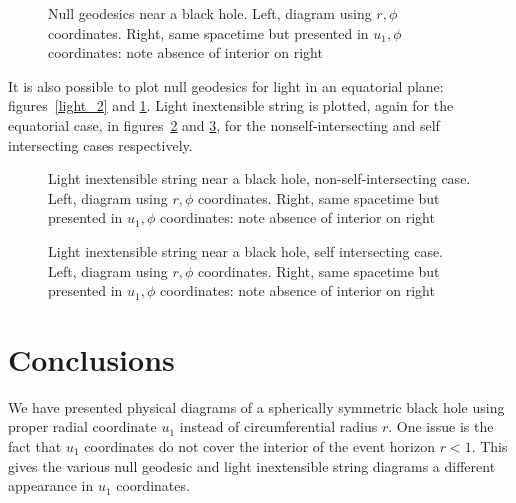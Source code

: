 \documentclass{article}
\begin{document}
\begin{figure}%
    \centering
    \caption{Null geodesics near a black hole.  Left, diagram using $r,\phi$
      coordinates.  Right, same spacetime but presented in $u_1,\phi$
      coordinates: note absence of interior on right}
    \label{light_closest_2}%
\end{figure}

It is also possible to plot null geodesics for light in an equatorial
plane: figures~\ref{light_2} and \ref{light_closest_2}.  Light
inextensible string is plotted, again for the equatorial case, in
figures~\ref{closest_approach_nonself} and
\ref{closest_approach_self}, for the nonself-intersecting and self
intersecting cases respectively.


\begin{figure}%
    \centering
    \caption{Light inextensible string near a black hole,
      non-self-intersecting case.  Left, diagram using $r,\phi$
      coordinates.  Right, same spacetime but presented in $u_1,\phi$
      coordinates: note absence of interior on right}
    \label{closest_approach_nonself}%
\end{figure}

\begin{figure}%
    \centering
    \caption{Light inextensible string near a black hole, self
      intersecting case.  Left, diagram using $r,\phi$ coordinates.
      Right, same spacetime but presented in $u_1,\phi$ coordinates:
      note absence of interior on right}
    \label{closest_approach_self}%
\end{figure}

\section{Conclusions}

We have presented physical diagrams of a spherically symmetric black
hole using proper radial coordinate $u_1$ instead of circumferential
radius $r$.  One issue is the fact that $u_1$ coordinates do not cover
the interior of the event horizon $r<1$.  This gives the various null
geodesic and light inextensible string diagrams a different appearance
in $u_1$ coordinates.


\end{document}
